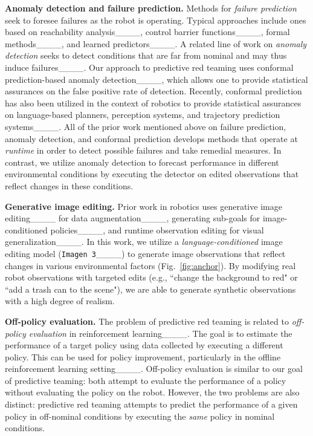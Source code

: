 {\bf Anomaly detection and failure prediction.} Methods for \emph{failure prediction} seek to foresee failures as the robot is operating. Typical approaches include ones based on reachability analysis____, control barrier functions____, formal methods____, and learned predictors____. A related line of work on \emph{anomaly detection} seeks to detect conditions that are far from nominal and may thus induce failures____. Our approach to predictive red teaming uses conformal prediction-based anomaly detection____, which allows one to provide statistical assurances on the false positive rate of detection. Recently, conformal prediction has also been utilized in the context of robotics to provide statistical assurances on language-based planners, perception systems, and trajectory prediction systems____. All of the prior work mentioned above on failure prediction, anomaly detection, and conformal prediction develops methods that operate at \emph{runtime} in order to detect possible failures and take remedial measures. In contrast, we utilize anomaly detection to forecast performance in different environmental conditions by executing the detector on edited observations that reflect changes in these conditions. 

{\bf Generative image editing.} Prior work in robotics uses generative image editing____ for data augmentation____, generating sub-goals for image-conditioned policies____, and runtime observation editing for visual generalization____. In this work, we utilize a \emph{language-conditioned} image editing model (\texttt{Imagen 3}____) to generate image observations that reflect changes in various environmental factors (Fig.~\ref{fig:anchor}). By modifying real robot observations with targeted edits (e.g., ``change the background to red" or ``add a trash can to the scene"), we are able to generate synthetic observations with a high degree of realism. 

{\bf Off-policy evaluation.} The problem of predictive red teaming is related to \emph{off-policy evaluation} in reinforcement learning____. The goal is to estimate the performance of a target policy using data collected by executing a different policy. This can be used for policy improvement, particularly in the offline reinforcement learning setting____. Off-policy evaluation is similar to our goal of predictive teaming: both attempt to evaluate the performance of a policy without evaluating the policy on the robot. However, the two problems are also distinct: predictive red teaming attempts to predict the performance of a given policy in off-nominal conditions by executing the \emph{same} policy in nominal conditions. 

